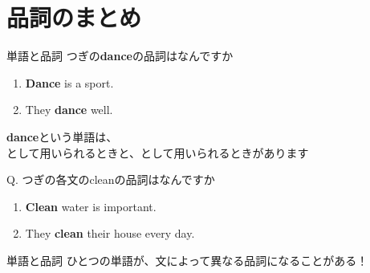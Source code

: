 \documentclass[aspectratio=169, xcolor={dvipsnames,table}]{beamer}
\begin{document}
  \section{品詞のまとめ}
  \begin{frame}[plain]{単語と品詞}
    つぎの\textbf{dance}の品詞はなんですか

    \begin{enumerate}[<+->]
      \item \textbf{Dance} is a sport.

      \item They \textbf{dance} well.
    \end{enumerate}
    \pause

    \textbf{dance}という単語は、\\[5pt]として用いられるときと、として用いられるときがあります

    \pause
    \vspace{20pt}
    Q. つぎの各文のcleanの品詞はなんですか

    \begin{enumerate}
      \item \textbf{Clean} water is important.

      \item They \textbf{clean} their house every day.
    \end{enumerate}
  \end{frame}
  \begin{frame}[plain]{単語と品詞}
    ひとつの単語が、文によって異なる品詞になることがある！
  \end{frame}
\end{document}
